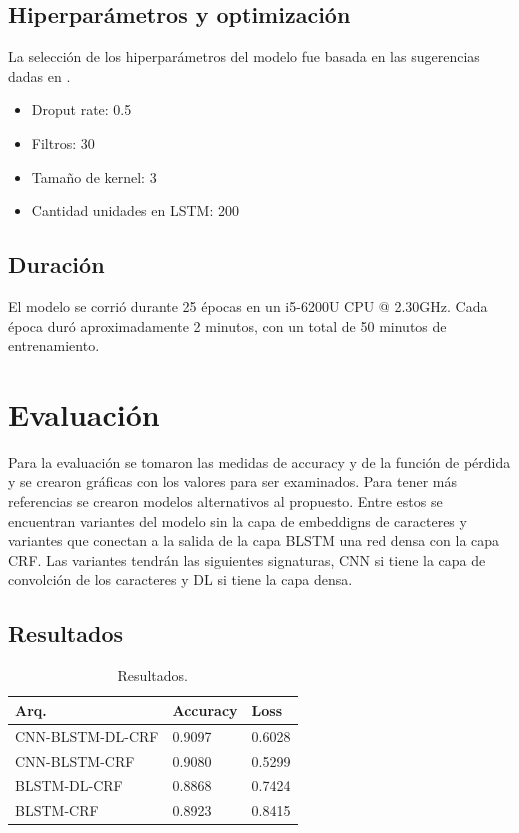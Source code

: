 \documentclass[runningheads]{llncs}
\begin{document}
\subsection{Hiperparámetros y optimización}

La selección de los hiperparámetros del modelo fue basada en las sugerencias dadas en
\cite{paper}.

\begin{itemize}
	\item Droput rate: 0.5
	\item Filtros: 30
	\item Tamaño de kernel: 3
	\item Cantidad unidades en LSTM: 200  
\end{itemize}

\subsection{Duración}

El modelo se corrió durante 25 épocas en un i5-6200U CPU @ 2.30GHz. Cada época
duró aproximadamente 2 minutos, con un total de 50 minutos de entrenamiento.

\section{Evaluación}

Para la evaluación se tomaron las medidas de accuracy y de la función de pérdida y se
crearon gráficas con los valores para ser examinados. Para tener más referencias se
crearon modelos alternativos al propuesto. Entre estos se encuentran variantes del
modelo sin la capa de embeddigns de caracteres y variantes que conectan a la salida
de la capa BLSTM una red densa con la capa CRF. Las variantes tendrán las siguientes
signaturas, CNN si tiene la capa de convolción de los caracteres y DL si tiene la capa
densa.

\subsection{Resultados}

\begin{table}
	\centering
	\caption{Resultados.}\label{results}
	\begin{tabular}{|l|l|l|}
	\hline
		Arq. &  Accuracy & Loss \\
	\hline
		CNN-BLSTM-DL-CRF & 0.9097 & 0.6028 \\
		CNN-BLSTM-CRF 	  & 0.9080 & 0.5299 \\
		BLSTM-DL-CRF 	  & 0.8868 & 0.7424 \\
		BLSTM-CRF 		  & 0.8923 & 0.8415 \\
	\hline
	\end{tabular}
\end{table}
\end{document}
